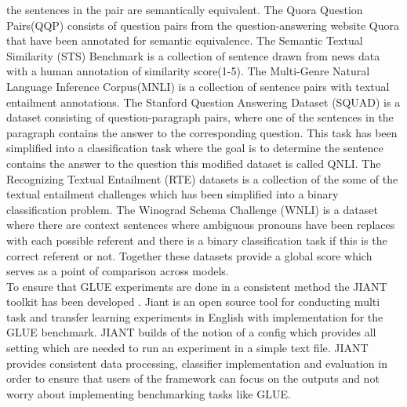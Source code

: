 the sentences in the pair are semantically equivalent. The Quora Question Pairs(QQP) consists of question pairs from the question-answering website Quora that have been annotated for semantic equivalence. The Semantic Textual Similarity (STS) Benchmark \cite{Cer2017SemEval2017T1} is a collection of sentence drawn from news data with a human annotation of similarity score(1-5). The Multi-Genre Natural Language Inference Corpus(MNLI) \cite{Williams2018ABC} is a collection of sentence pairs with textual entailment annotations. The Stanford Question Answering Dataset (SQUAD) \cite{Rajpurkar2016SQuAD10} is a dataset consisting of question-paragraph pairs, where one of the sentences in the paragraph contains the answer to the corresponding question. This task has been simplified into a classification task where the goal is to determine the sentence contains the answer to the question this modified dataset is called QNLI. The Recognizing Textual Entailment (RTE) datasets is a collection of the some of the textual entailment challenges \cite{Dagan2005ThePR} \cite{BarHaim2006TheSP} \cite{Giampiccolo2007TheTP}\cite{Bentivogli2009TheSP} which has been simplified into a binary classification problem. The Winograd Schema Challenge (WNLI) \cite{Levesque2011TheWS} is a dataset where there are context sentences where ambiguous pronouns have been replaces with each possible referent and there is a binary classification task if this is the correct referent or not. Together these datasets provide a global score which serves as a point of comparison across models. \\ 
To ensure that GLUE experiments are done in a consistent method the JIANT toolkit has been developed \cite{Pruksachatkun2020jiantAS}. Jiant is an open source tool for conducting multi task and transfer learning experiments in English with implementation for the GLUE benchmark. JIANT builds of the notion of a config which provides all setting which are needed to run an experiment in a simple text file. JIANT provides consistent data processing, classifier implementation and evaluation in order to ensure that users of the framework can focus on the outputs and not worry about implementing benchmarking tasks like GLUE.